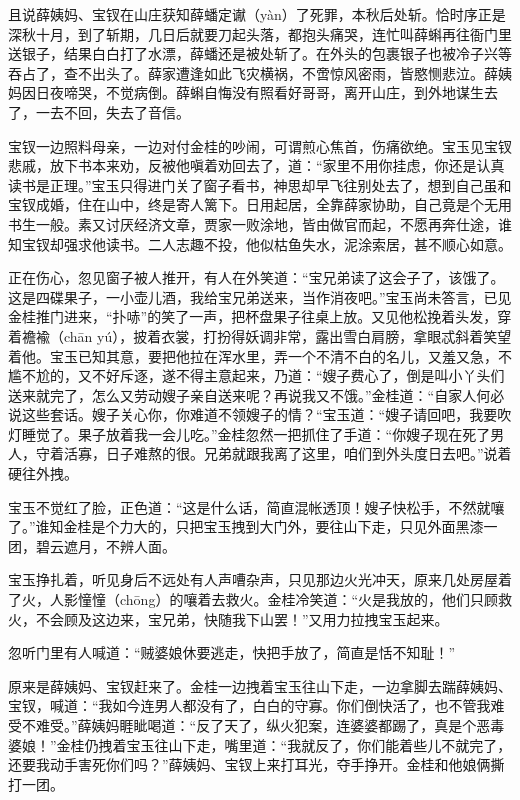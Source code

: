 \documentclass[12pt,oneside]{book}
\begin{document}
且说薛姨妈、宝钗在山庄获知薛蟠定谳（yàn）了死罪，本秋后处斩。恰时序正是深秋十月，到了斩期，几日后就要刀起头落，都抱头痛哭，连忙叫薛蝌再往衙门里送银子，结果白白打了水漂，薛蟠还是被处斩了。在外头的包裹银子也被冷子兴等吞占了，查不出头了。薛家遭逢如此飞灾横祸，不啻惊风密雨，皆愍恻悲泣。薛姨妈因日夜啼哭，不觉病倒。薛蝌自悔没有照看好哥哥，离开山庄，到外地谋生去了，一去不回，失去了音信。

宝钗一边照料母亲，一边对付金桂的吵闹，可谓煎心焦首，伤痛欲绝。宝玉见宝钗悲戚，放下书本来劝，反被他嗔着劝回去了，道：“家里不用你挂虑，你还是认真读书是正理。”宝玉只得进门关了窗子看书，神思却早飞往别处去了，想到自己虽和宝钗成婚，住在山中，终是寄人篱下。日用起居，全靠薛家协助，自己竟是个无用书生一般。素又讨厌经济文章，贾家一败涂地，皆由做官而起，不愿再奔仕途，谁知宝钗却强求他读书。二人志趣不投，他似枯鱼失水，泥涂索居，甚不顺心如意。

正在伤心，忽见窗子被人推开，有人在外笑道：“宝兄弟读了这会子了，该饿了。这是四碟果子，一小壶儿酒，我给宝兄弟送来，当作消夜吧。”宝玉尚未答言，已见金桂推门进来，“扑哧”的笑了一声，把杯盘果子往桌上放。又见他松挽着头发，穿着襜褕（chān yú），披着衣裳，打扮得妖调非常，露出雪白肩膀，拿眼忒斜着笑望着他。宝玉已知其意，要把他拉在浑水里，弄一个不清不白的名儿，又羞又急，不尴不尬的，又不好斥逐，遂不得主意起来，乃道：“嫂子费心了，倒是叫小丫头们送来就完了，怎么又劳动嫂子亲自送来呢？再说我又不饿。”金桂道：“自家人何必说这些套话。嫂子关心你，你难道不领嫂子的情？“宝玉道：“嫂子请回吧，我要吹灯睡觉了。果子放着我一会儿吃。”金桂忽然一把抓住了手道：“你嫂子现在死了男人，守着活寡，日子难熬的很。兄弟就跟我离了这里，咱们到外头度日去吧。”说着硬往外拽。

宝玉不觉红了脸，正色道：“这是什么话，简直混帐透顶！嫂子快松手，不然就嚷了。”谁知金桂是个力大的，只把宝玉拽到大门外，要往山下走，只见外面黑漆一团，碧云遮月，不辨人面。

宝玉挣扎着，听见身后不远处有人声嘈杂声，只见那边火光冲天，原来几处房屋着了火，人影憧憧（chōng）的嚷着去救火。金桂冷笑道：“火是我放的，他们只顾救火，不会顾及这边来，宝兄弟，快随我下山罢！”又用力拉拽宝玉起来。

忽听门里有人喊道：“贼婆娘休要逃走，快把手放了，简直是恬不知耻！”

原来是薛姨妈、宝钗赶来了。金桂一边拽着宝玉往山下走，一边拿脚去踹薛姨妈、宝钗，喊道：“我如今连男人都没有了，白白的守寡。你们倒快活了，也不管我难受不难受。”薛姨妈睚眦喝道：“反了天了，纵火犯案，连婆婆都踢了，真是个恶毒婆娘！”金桂仍拽着宝玉往山下走，嘴里道：“我就反了，你们能着些儿不就完了，还要我动手害死你们吗？”薛姨妈、宝钗上来打耳光，夺手挣开。金桂和他娘俩撕打一团。
\end{document}
